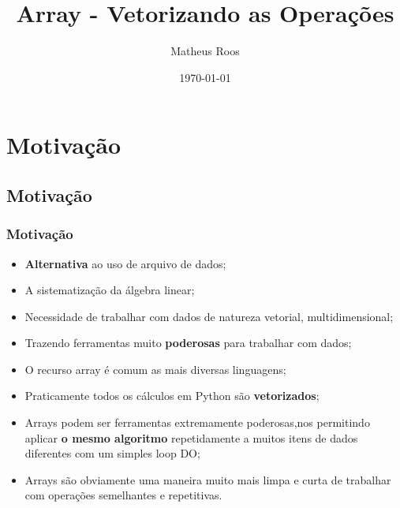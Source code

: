 \documentclass[notes=show]{beamer}
\begin{document}
\title[Array - Vetorizando Operações]{Array - Vetorizando as Operações}
\author[Roos]{Matheus Roos}
\date{\today}
\maketitle
\begin{frame}
\tableofcontents
\end{frame}
\section{Motiva\c{c}\~{a}o}
\subsection{Motivação}
\begin{frame}
\frametitle{Motivação}
\begin{itemize}
	\item \textbf{Alternativa} ao uso de arquivo de dados;
	\item A sistematização da álgebra linear;
	\item Necessidade de trabalhar com dados de natureza vetorial, multidimensional;
	\item Trazendo ferramentas muito \textbf{poderosas} para trabalhar com dados;
	\item O recurso array é comum as mais diversas linguagens;
	\item Praticamente todos os cálculos em Python são \textbf{vetorizados};
	\item Arrays podem ser ferramentas extremamente poderosas,nos permitindo
	aplicar \textbf{o mesmo algoritmo} repetidamente a muitos itens de dados diferentes
	com um simples loop DO;
	\item Arrays s\~{a}o obviamente uma maneira muito mais limpa e curta de
	trabalhar com opera\c{c}\~{o}es semelhantes e repetitivas.
\end{itemize}
\end{frame}
\end{document}
